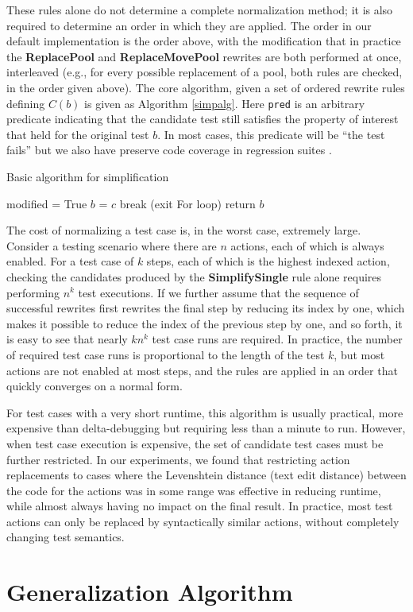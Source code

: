 These rules alone do not determine a complete normalization method; it is
also required to determine an order in which they are applied.  The
order in our default implementation is the order above, with the
modification that in practice the {\bf ReplacePool} and {\bf
  ReplaceMovePool} rewrites are both performed at once, interleaved
(e.g., for every possible replacement of a pool, both rules are
checked, in the order given above).  The core algorithm, given a set
of ordered rewrite rules defining $C(b)$ is given as Algorithm
\ref{simpalg}.  Here {\tt pred} is an arbitrary predicate indicating
that the candidate test still satisfies the property of interest that
held for the original test $b$.  In most cases, this predicate will be
``the test fails'' but we also have preserve
code coverage in regression suites \cite{icst2014}.

\begin{algorithm}
\caption{Basic algorithm for simplification}
\label{simpalg}
\begin{algorithmic}[1]
\State modified = True
\State $b$ = $c$
\State break (exit For loop)
\EndIf
\EndFor
\EndWhile
\State return $b$
\end{algorithmic}
\end{algorithm}

The cost of normalizing a test case is, in the worst case, extremely
large.  Consider a testing scenario where there are $n$ actions, each
of which is always enabled.  For a test case of $k$ steps, each of
which is the highest indexed action, checking the candidates produced
by the {\bf SimplifySingle} rule alone requires performing $n^k$
test executions.  If we further assume that the sequence of successful rewrites
first rewrites the final step by reducing its index by one, which
makes it possible to reduce the index of the previous step by one, and
so forth, it is easy to see that nearly $k n^k$ test case runs are
required.  In practice, the number of required test case runs is
proportional to the length of the test $k$, but most actions are not
enabled at most steps, and the rules are applied in an order that
quickly converges on a normal form.

For test cases with a very short runtime, this algorithm is usually
practical, more expensive than delta-debugging but requiring less than
a minute to run.  However, when test case execution is expensive, the
set of candidate test cases must be further restricted.  In our
experiments, we found that restricting action replacements to cases
where the Levenshtein \cite{Lev} distance (text edit distance) between
the code for the actions was in some range was effective in reducing
runtime, while almost always having no impact on the final result.  In
practice, most test actions can only be replaced by syntactically
similar actions, without completely changing test semantics.

\section{Generalization Algorithm}